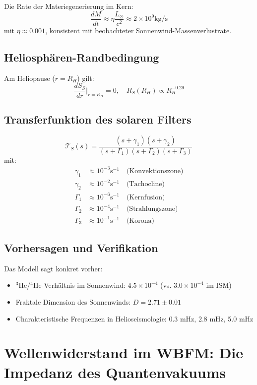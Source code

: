 Die Rate der Materiegenerierung im Kern:
\[
\frac{dM}{dt} \approx \eta \frac{L_\odot}{c^2} \approx 2 \times 10^9  \text{kg/s}
\]
mit $\eta \approx 0.001$, konsistent mit beobachteter Sonnenwind-Massenverlustrate.

\subsection{Heliosphären-Randbedingung}

Am Heliopause ($r = R_H$) gilt:
\[
\frac{dS_S}{dr}\Big|_{r=R_H} = 0, \quad R_S(R_H) \propto R_H^{-0.29}
\]

\subsection{Transferfunktion des solaren Filters}

\[
\mathcal{T}_S(s) = \frac{(s + \gamma_1)(s + \gamma_2)}{(s + \Gamma_1)(s + \Gamma_2)(s + \Gamma_3)}
\]
mit:
\begin{align*}
\gamma_1 &\approx 10^{-3}  \text{s}^{-1} \quad \text{(Konvektionszone)} \\
\gamma_2 &\approx 10^{-2}  \text{s}^{-1} \quad \text{(Tachocline)} \\
\Gamma_1 &\approx 10^{-6}  \text{s}^{-1} \quad \text{(Kernfusion)} \\
\Gamma_2 &\approx 10^{-4}  \text{s}^{-1} \quad \text{(Strahlungszone)} \\
\Gamma_3 &\approx 10^{-1}  \text{s}^{-1} \quad \text{(Korona)}
\end{align*}

\subsection{Vorhersagen und Verifikation}

Das Modell sagt konkret vorher:
\begin{itemize}
\item $^3$He/$^4$He-Verhältnis im Sonnenwind: $4.5 \times 10^{-4}$ (vs. $3.0 \times 10^{-4}$ im ISM)
\item Fraktale Dimension des Sonnenwinds: $D = 2.71 \pm 0.01$
\item Charakteristische Frequenzen in Helioseismologie: 0.3 mHz, 2.8 mHz, 5.0 mHz
\end{itemize}

\section{Wellenwiderstand im WBFM: Die Impedanz des Quantenvakuums}


